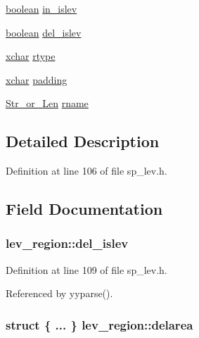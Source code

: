 \begin{DoxyCompactItemize}
\begin{tabbing}
\end{tabbing}\item 
\hyperlink{global_8h_a531b10dd351aa162d7dcccd1966308b8}{boolean} \hyperlink{structlev__region_ae6ed5c772b8107a84076d5d25963dc1a}{in\+\_\+islev}
\item 
\hyperlink{global_8h_a531b10dd351aa162d7dcccd1966308b8}{boolean} \hyperlink{structlev__region_ad7bbb4b699bb721ce83c804102950652}{del\+\_\+islev}
\item 
\hyperlink{global_8h_a2043b7d01ce89f4ee2fa6c345a752d32}{xchar} \hyperlink{structlev__region_a428f47785b096c23eacbf88a37a06825}{rtype}
\item 
\hyperlink{global_8h_a2043b7d01ce89f4ee2fa6c345a752d32}{xchar} \hyperlink{structlev__region_a368470df9ece324104871a2fa10733fa}{padding}
\item 
\hyperlink{sp__lev_8h_ac575b18cce85a1027632cac53c2c42ac}{Str\+\_\+or\+\_\+\+Len} \hyperlink{structlev__region_a1ffe181e974927ec122af731747ef8c7}{rname}
\end{DoxyCompactItemize}


\subsection{Detailed Description}


Definition at line 106 of file sp\+\_\+lev.\+h.



\subsection{Field Documentation}
\hypertarget{structlev__region_ad7bbb4b699bb721ce83c804102950652}{
\subsubsection[{del\+\_\+islev}]{ lev\+\_\+region\+::del\+\_\+islev}}\label{structlev__region_ad7bbb4b699bb721ce83c804102950652}


Definition at line 109 of file sp\+\_\+lev.\+h.



Referenced by yyparse().

\hypertarget{structlev__region_abc20c12592d79932eb0140707d140671}{
\subsubsection[{delarea}]{\setlength{\rightskip}{0pt plus 5cm}struct \{ ... \}   lev\+\_\+region\+::delarea}}\label{structlev__region_abc20c12592d79932eb0140707d140671}


